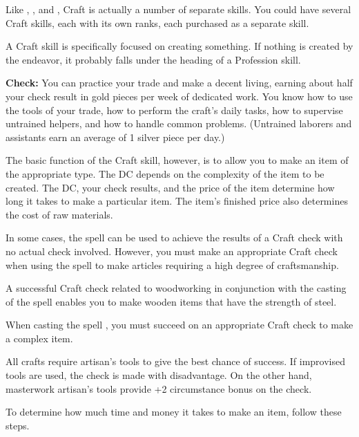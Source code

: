 Like , , and , Craft is actually a number of separate skills. You could have several Craft skills, each with its own ranks, each purchased as a separate skill.

A Craft skill is specifically focused on creating something. If nothing is created by the endeavor, it probably falls under the heading of a Profession skill.

\textbf{Check:} You can practice your trade and make a decent living, earning about half your check result in gold pieces per week of dedicated work. You know how to use the tools of your trade, how to perform the craft's daily tasks, how to supervise untrained helpers, and how to handle common problems. (Untrained laborers and assistants earn an average of 1 silver piece per day.)

The basic function of the Craft skill, however, is to allow you to make an item of the appropriate type. The DC depends on the complexity of the item to be created. The DC, your check results, and the price of the item determine how long it takes to make a particular item. The item's finished price also determines the cost of raw materials.

In some cases, the  spell can be used to achieve the results of a Craft check with no actual check involved. However, you must make an appropriate Craft check when using the spell to make articles requiring a high degree of craftsmanship.

A successful Craft check related to woodworking in conjunction with the casting of the  spell enables you to make wooden items that have the strength of steel.

When casting the spell , you must succeed on an appropriate Craft check to make a complex item.

All crafts require artisan's tools to give the best chance of success. If improvised tools are used, the check is made with disadvantage. On the other hand, masterwork artisan's tools provide +2 circumstance bonus on the check.

To determine how much time and money it takes to make an item, follow these steps.

